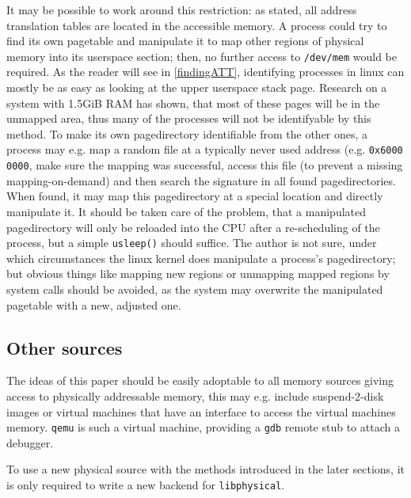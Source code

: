 It may be possible to work around this restriction: as stated, all address
translation tables are located in the accessible memory. A process could try to
find its own pagetable and manipulate it to map other regions of physical memory
into its userspace section; then, no further access to \texttt{/dev/mem} would
be required. As the reader will see in \ref{findingATT}, identifying processes
in linux can mostly be as easy as looking at the upper userspace stack page.
Research on a system with 1.5GiB RAM has shown, that most of these pages will be
in the unmapped area, thus many of the processes will not be identifyable by
this method. To make its own pagedirectory identifiable from the other ones, a
process may e.g. map a random file at a typically never used address (e.g.
\texttt{0x6000 0000}, make sure the mapping was successful, access this file (to
prevent a missing mapping-on-demand) and then search the signature in all found
pagedirectories. When found, it may map this pagedirectory at a special location
and directly manipulate it. It should be taken care of the problem, that a
manipulated pagedirectory will only be reloaded into the CPU after a
re-scheduling of the process, but a simple \texttt{usleep()} should suffice. The
author is not sure, under which circumstances the linux kernel does manipulate a
process's pagedirectory; but obvious things like mapping new regions or
unmapping mapped regions by system calls should be avoided, as the system may
overwrite the manipulated pagetable with a new, adjusted one.



\subsection{Other sources}

The ideas of this paper should be easily adoptable to all memory sources giving
access to physically addressable memory, this may e.g. include suspend-2-disk
images or virtual machines that have an interface to access the virtual machines
memory.  \texttt{qemu} is such a virtual machine, providing a \texttt{gdb}
remote stub to attach a debugger.

To use a new physical source with the methods introduced in the later sections,
it is only required to write a new backend for \texttt{libphysical}.

